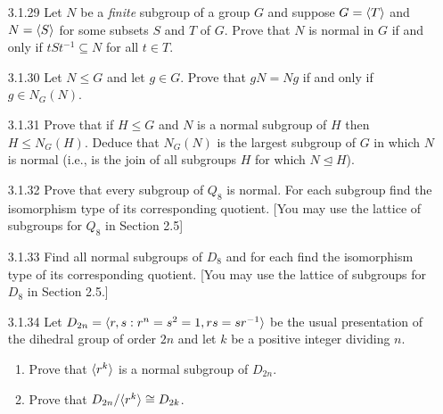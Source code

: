 \begin{enumerate}
   \item[3.1.29]  Let $N$ be a \textit{finite} subgroup of a group $G$ and
                  suppose $G = \langle T \rangle$ and $N = \langle S \rangle$ for some subsets $S$
                  and $T$ of $G$. Prove that $N$ is normal in $G$ if and only if
                  $tSt^{-1} \subseteq N$ for all $t \in T$.
   \item[3.1.30]  Let $N \le G$ and let $g \in G$. Prove that $gN = Ng$ if and
                  only if $g \in N_G(N)$.
   \item[3.1.31]  Prove that if $H \le G$ and $N$ is a normal subgroup of $H$
                  then $H \le N_G(H)$. Deduce that $N_G(N)$ is the largest
                  subgroup of $G$ in which $N$ is normal (i.e., is the join of
                  all subgroups $H$ for which $N \trianglelefteq H$).
   \item[3.1.32]  Prove that every subgroup of $Q_8$ is normal. For each
                  subgroup find the isomorphism type of its corresponding
                  quotient. [You may use the lattice of subgroups for $Q_8$ in
                  Section 2.5]
   \item[3.1.33]  Find all normal subgroups of $D_8$ and for each find the
                  isomorphism type of its corresponding quotient. [You may use
                  the lattice of subgroups for $D_8$ in Section 2.5.]
   \item[3.1.34]  Let $D_{2n} = \langle r, s : r^n = s^2 = 1, rs = sr^{-1} \rangle$ be the
                  usual presentation of the dihedral group of order $2n$ and let
                  $k$ be a positive integer dividing $n$.
                  \begin{enumerate}
                     \item Prove that $\langle r^k \rangle$ is a normal subgroup of
                           $D_{2n}$.
                     \item Prove that $D_{2n}/\langle r^k \rangle \cong D_{2k}$.
                  \end{enumerate}

\end{enumerate}
